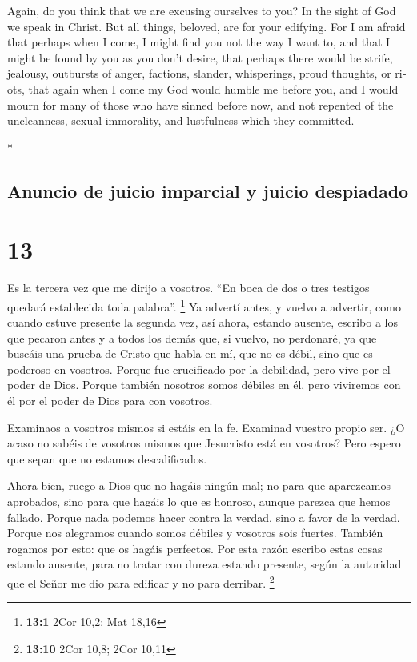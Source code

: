 \begin{paracol}{2}
\begin{otherlanguage}{english}
 Again, do you think that we are excusing ourselves to
you? In the sight of God we speak in Christ. But all things, beloved,
are for your edifying.  For I am afraid that perhaps when
I come, I might find you not the way I want to, and that I might be
found by you as you don't desire, that perhaps there would be strife,
jealousy, outbursts of anger, factions, slander, whisperings, proud
thoughts, or riots,  that again when I come my God would
humble me before you, and I would mourn for many of those who have
sinned before now, and not repented of the uncleanness, sexual
immorality, and lustfulness which they committed.

\end{otherlanguage}

\switchcolumn[0]*

\hypertarget{anuncio-de-juicio-imparcial-y-juicio-despiadado}{%
\subsection{Anuncio de juicio imparcial y juicio
despiadado}\label{anuncio-de-juicio-imparcial-y-juicio-despiadado}}

\hypertarget{section-24}{%
\section{13}\label{section-24}}

 Es la tercera vez que me dirijo a vosotros. ``En boca de
dos o tres testigos quedará establecida toda palabra''. \footnote{\textbf{13:1}
  2Cor 10,2; Mat 18,16}  Ya advertí antes, y vuelvo a
advertir, como cuando estuve presente la segunda vez, así ahora, estando
ausente, escribo a los que pecaron antes y a todos los demás que, si
vuelvo, no perdonaré,  ya que buscáis una prueba de Cristo
que habla en mí, que no es débil, sino que es poderoso en vosotros.
 Porque fue crucificado por la debilidad, pero vive por el
poder de Dios. Porque también nosotros somos débiles en él, pero
viviremos con él por el poder de Dios para con vosotros.

 Examinaos a vosotros mismos si estáis en la fe. Examinad
vuestro propio ser. ¿O acaso no sabéis de vosotros mismos que Jesucristo
está en vosotros?  Pero espero que sepan que no estamos
descalificados.

 Ahora bien, ruego a Dios que no hagáis ningún mal; no
para que aparezcamos aprobados, sino para que hagáis lo que es honroso,
aunque parezca que hemos fallado.  Porque nada podemos
hacer contra la verdad, sino a favor de la verdad.  Porque
nos alegramos cuando somos débiles y vosotros sois fuertes. También
rogamos por esto: que os hagáis perfectos.  Por esta
razón escribo estas cosas estando ausente, para no tratar con dureza
estando presente, según la autoridad que el Señor me dio para edificar y
no para derribar. \footnote{\textbf{13:10} 2Cor 10,8; 2Cor 10,11}


\end{paracol}
